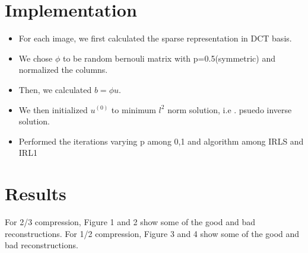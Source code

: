\documentclass[a4paper]{article}
\begin{document}
\section{Implementation}
\begin{itemize}
\item For each image, we first calculated the sparse representation in DCT basis.
\item We chose $\phi$ to be random bernouli matrix with p=0.5(symmetric) and normalized the columns.
\item Then, we calculated $b=\phi u$.
\item We then initialized $u^{(0)}$ to minimum $l^2$ norm solution, i.e . psuedo inverse solution. 
\item Performed the iterations varying p among 0,1 and algorithm among IRLS and IRL1
\end{itemize}
     
\section{Results}
For 2/3 compression, Figure 1 and 2 show some of the good and bad reconstructions. For 1/2 compression, Figure 3 and 4 show some of the good and bad reconstructions.
\end{document}
